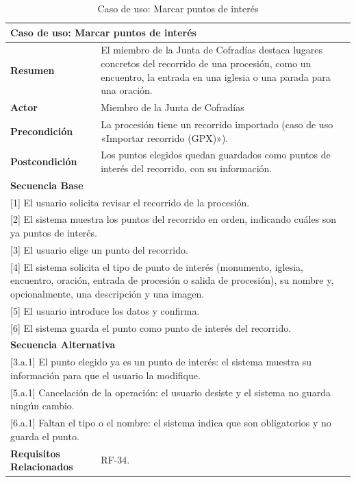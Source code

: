 \begin{table}[h!]
    \centering
    \renewcommand{\arraystretch}{1.5}

    \begin{tabular}{|p{4cm}|p{11cm}|}
        \hline
        \multicolumn{2}{|l|}{\textbf{Caso de uso: Marcar puntos de interés}} \\
        \hline
        \textbf{Resumen} & El miembro de la Junta de Cofradías destaca lugares concretos del recorrido de una procesión, como un encuentro, la entrada en una iglesia o una parada para una oración. \\
        \hline
        \textbf{Actor} & Miembro de la Junta de Cofradías \\
        \hline
        \textbf{Precondición} & La procesión tiene un recorrido importado (caso de uso «Importar recorrido (GPX)»). \\
        \hline
        \textbf{Postcondición} & Los puntos elegidos quedan guardados como puntos de interés del recorrido, con su información. \\
        \hline
        \multicolumn{2}{|l|}{\textbf{Secuencia Base}} \\
        \hline
        \multicolumn{2}{|p{15cm}|}{ [1] El usuario solicita revisar el recorrido de la procesión. } \\
        \hline
        \multicolumn{2}{|p{15cm}|}{ [2] El sistema muestra los puntos del recorrido en orden, indicando cuáles son ya puntos de interés. } \\
        \hline
        \multicolumn{2}{|p{15cm}|}{ [3] El usuario elige un punto del recorrido. } \\
        \hline
        \multicolumn{2}{|p{15cm}|}{ [4] El sistema solicita el tipo de punto de interés (monumento, iglesia, encuentro, oración, entrada de procesión o salida de procesión), su nombre y, opcionalmente, una descripción y una imagen. } \\
        \hline
        \multicolumn{2}{|p{15cm}|}{ [5] El usuario introduce los datos y confirma. } \\
        \hline
        \multicolumn{2}{|p{15cm}|}{ [6] El sistema guarda el punto como punto de interés del recorrido. } \\
        \hline
        \multicolumn{2}{|l|}{\textbf{Secuencia Alternativa}} \\
        \hline
        \multicolumn{2}{|p{15cm}|}{ [3.a.1] El punto elegido ya es un punto de interés: el sistema muestra su información para que el usuario la modifique. } \\
        \hline
        \multicolumn{2}{|p{15cm}|}{ [5.a.1] Cancelación de la operación: el usuario desiste y el sistema no guarda ningún cambio. } \\
        \hline
        \multicolumn{2}{|p{15cm}|}{ [6.a.1] Faltan el tipo o el nombre: el sistema indica que son obligatorios y no guarda el punto. } \\
        \hline
        \textbf{Requisitos Relacionados} & RF-34. \\
        \hline
    \end{tabular}
    \caption{Caso de uso: Marcar puntos de interés}
\end{table}

